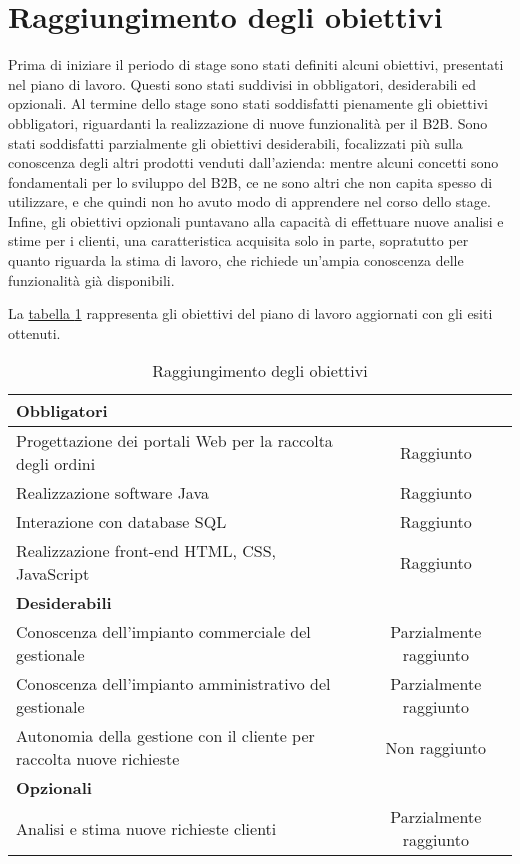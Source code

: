 \section{Raggiungimento degli obiettivi}
Prima di iniziare il periodo di stage sono stati definiti alcuni obiettivi, presentati nel piano di lavoro. Questi sono stati suddivisi in obbligatori, desiderabili ed opzionali. Al termine dello stage sono stati soddisfatti pienamente gli obiettivi obbligatori, riguardanti la realizzazione di nuove funzionalità per il B2B. Sono stati soddisfatti parzialmente gli obiettivi desiderabili, focalizzati più sulla conoscenza degli altri prodotti venduti dall'azienda: mentre alcuni concetti sono fondamentali per lo sviluppo del B2B, ce ne sono altri che non capita spesso di utilizzare, e che quindi non ho avuto modo di apprendere nel corso dello stage. Infine, gli obiettivi opzionali puntavano alla capacità di effettuare nuove analisi e stime per i clienti, una caratteristica acquisita solo in parte, sopratutto per quanto riguarda la stima di lavoro, che richiede un'ampia conoscenza delle funzionalità già disponibili.

La \hyperref[tab:obiettivi-2]{tabella \ref{tab:obiettivi-2}} rappresenta gli obiettivi del piano di lavoro aggiornati con gli esiti ottenuti.
\begin{table}
	\centering
	\begin{tabular}{|m{9.3cm}|c|}
		\hline
		\multicolumn{2}{|l|}{\textbf{Obbligatori}} \\
		\hline
		Progettazione dei portali Web per la raccolta degli ordini & Raggiunto \\
		\hline
		Realizzazione software Java & Raggiunto \\
		\hline
		Interazione con database SQL & Raggiunto \\
		\hline
		Realizzazione front-end HTML, CSS, JavaScript & Raggiunto \\
		\hline
		\multicolumn{2}{|l|}{\textbf{Desiderabili}}\\
		\hline
		Conoscenza dell'impianto commerciale del gestionale & Parzialmente raggiunto \\
		\hline
		Conoscenza dell'impianto amministrativo del gestionale & Parzialmente raggiunto \\
		\hline
		Autonomia della gestione con il cliente per raccolta nuove richieste & Non raggiunto \\
		\hline
		\multicolumn{2}{|l|}{\textbf{Opzionali}} \\
		\hline
		Analisi e stima nuove richieste clienti & Parzialmente raggiunto \\
		\hline
	\end{tabular}
	\caption{Raggiungimento degli obiettivi}
	\label{tab:obiettivi-2}
\end{table}


